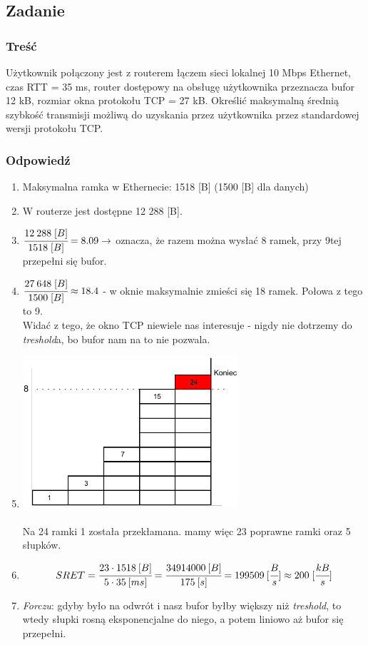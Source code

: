 \documentclass[a4paper,twoside]{article}
\begin{document}
\subsection{Zadanie}
\subsubsection{Treść}
Użytkownik połączony jest z routerem łączem sieci lokalnej 10 Mbps Ethernet, czas RTT = 35 ms, router dostępowy na obsługę użytkownika przeznacza bufor 12 kB, rozmiar okna protokołu TCP = 27 kB. Określić maksymalną średnią szybkość transmisji możliwą do uzyskania przez użytkownika przez standardowej wersji protokołu TCP.
\subsubsection{Odpowiedź}
\begin{enumerate}
	\item Maksymalna ramka w Ethernecie: 1518 [B] (1500 [B] dla danych)
	\item W routerze jest dostępne 12 288 [B].
	\item $ \cfrac{12\:288\;[B]}{1518\;[B]}=8.09 \rightarrow $ oznacza, że razem można wysłać 8 ramek, przy 9tej przepełni się bufor.
	\item $ \cfrac{27\:648\;[B]}{1500\;[B]}\approx18.4 $ - w oknie maksymalnie zmieści się 18 ramek. Połowa z tego to 9.\\Widać z tego, że okno TCP niewiele nas interesuje - nigdy nie dotrzemy do \emph{treshold}a, bo bufor nam na to nie pozwala.
	\item \includegraphics[width=8.0cm]{./images/zadanie15.pdf}\\\\
	Na 24 ramki 1 została przekłamana. mamy więc 23 poprawne ramki oraz 5 słupków.
	\item $$ SRET=\cfrac{23\cdot1518\:[B]}{5\cdot35\:[ms]}=\cfrac{34914000\:[B]}{175\:[s]}=199509\:[\cfrac{B}{s}]\approx200\;[\cfrac{kB}{s}] $$                                 
	\item \emph{Forczu}: gdyby było na odwrót i nasz bufor byłby większy niż \emph{treshold}, to wtedy słupki rosną eksponencjalne do niego, a potem liniowo aż bufor się przepełni.
\end{enumerate}
\end{document}
